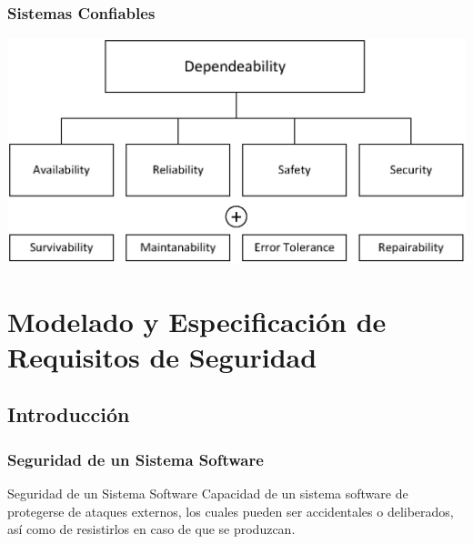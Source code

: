 \documentclass[a4paper,slidestop,xcolor=pst,dvips,blue]{beamer}
\begin{document}
\begin{frame}[c]
    \frametitle{Sistemas Confiables}
    \begin{center}
        \includegraphics[width=\linewidth]{images/sociotecnicos/dependeability.eps}
    \end{center}
\end{frame}

\section{Modelado y Especificación de Requisitos de Seguridad}

\subsection{Introducción}

\begin{frame}[c]
    \frametitle{Seguridad de un Sistema Software~\cite{sommerville:2010}}
    \begin{block}{Seguridad de un Sistema Software}
        Capacidad de un sistema software de protegerse de ataques externos, los cuales pueden ser accidentales o deliberados, así como de resistirlos en caso de que se produzcan.
    \end{block}
\end{frame}
\end{document}
